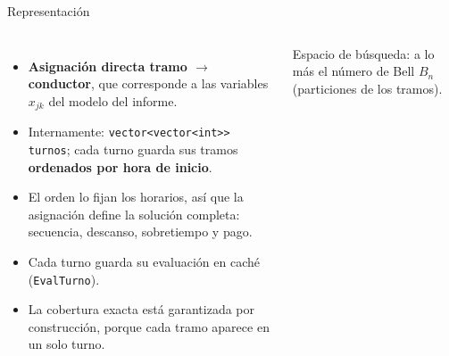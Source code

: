 \documentclass[aspectratio=169,10pt]{beamer}
\begin{document}
\begin{frame}{Representación}
\begin{columns}[T]
\begin{itemize}
\item \textbf{Asignación directa tramo $\to$ conductor}, que corresponde a las variables $x_{jk}$ del modelo del informe.
\item Internamente: \texttt{vector<vector<int>> turnos}; cada turno guarda sus tramos \textbf{ordenados por hora de inicio}.
\item El orden lo fijan los horarios, así que la asignación define la solución completa: secuencia, descanso, sobretiempo y pago.
\item Cada turno guarda su evaluación en caché (\texttt{EvalTurno}).
\item La cobertura exacta está garantizada por construcción, porque cada tramo aparece en un solo turno.
\end{itemize}

\vspace{0.5em}
\small Espacio de búsqueda: a lo más el número de Bell $B_n$ (particiones de los tramos).
\end{columns}
\end{frame}
\end{document}

